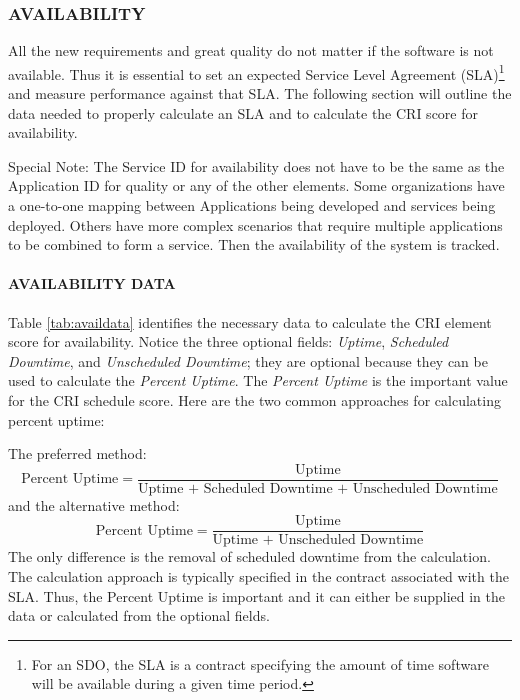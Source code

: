 \documentclass[SDSUThesis.tex]{subfiles}
\begin{document}
        \subsubsection{AVAILABILITY}
            All the new requirements and great quality do not matter if the software is not available.
            Thus it
            is essential to set an expected Service Level Agreement (SLA)\footnote{For an SDO, the SLA is a 
            contract specifying the amount of time software will be available during a
            given time period. } and measure 
            performance against that SLA.  The following section will outline the data needed to properly
            calculate an SLA and to calculate the CRI score for availability.
            
            Special Note: The Service ID for availability does not have to be the same
            as the Application ID for quality or any of the other elements.  Some 
            organizations have a one-to-one mapping between Applications being developed
            and services being deployed.  Others have more complex scenarios that require
            multiple applications to be combined to form a service.  Then the availability
            of the system is tracked.
            
            \paragraph{AVAILABILITY DATA}
                Table \ref{tab:availdata} identifies the necessary data to calculate
                the CRI element score for availability.  Notice the three optional 
                fields: \textit{Uptime}, \textit{Scheduled Downtime}, and 
                \textit{Unscheduled Downtime}; they are optional because they can be
                used to calculate the \textit{Percent Uptime}.  The \textit{Percent Uptime}
                is the important value for the CRI schedule score.  Here are the two common
                approaches for calculating percent uptime:
                
                The preferred method:
                \[
                    \text{Percent Uptime} = \frac{\text{Uptime}}{\text{Uptime + Scheduled Downtime + Unscheduled Downtime}}
                \]
                and the alternative method:
                \[
                    \text{Percent Uptime} = \frac{\text{Uptime}}{\text{Uptime + Unscheduled Downtime}}
                \]
                The only difference is the removal of scheduled downtime from 
                the calculation.  The calculation approach is typically specified in
                the contract associated with the SLA.  Thus, the Percent Uptime is important
                and it can either be supplied in the data or calculated from the 
                optional fields.
            
\end{document}
